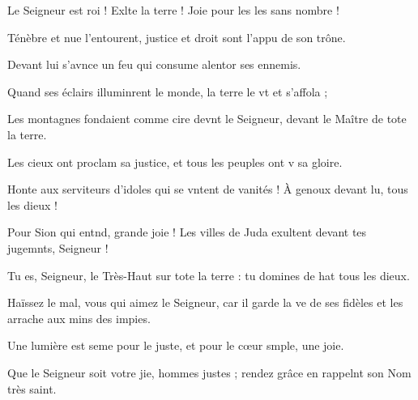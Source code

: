 \item Le Seigneur est roi ! Exlte la terre !\psstar{} Joie pour les les sans nombre !
\item Ténèbre et nue l’entourent,\psstar{} justice et droit sont l’appu de son trône.
\item Devant lui s’avnce un feu\psstar{} qui consume alentor ses ennemis.
\item Quand ses éclairs illuminrent le monde,\psstar{} la terre le vt et s’affola ;
\item Les montagnes fondaient comme cire devnt le Seigneur,\psstar{} devant le Maître de tote la terre.
\item Les cieux ont proclam sa justice,\psstar{} et tous les peuples ont v sa gloire.
\item Honte aux serviteurs d’idoles qui se vntent de vanités !\psstar{} À genoux devant lu, tous les dieux !
\item Pour Sion qui entnd, grande joie !\psstar{} Les villes de Juda exultent devant tes jugemnts, Seigneur !
\item Tu es, Seigneur, le Très-Haut sur tote la terre :\psstar{} tu domines de hat tous les dieux.
\item Haïssez le mal, vous qui aimez le Seigneur,\pscross{} car il garde la ve de ses fidèles\psstar{} et les arrache aux mins des impies.
\item Une lumière est seme pour le juste,\psstar{} et pour le cœur smple, une joie.
\item Que le Seigneur soit votre jie, hommes justes ;\psstar{} rendez grâce en rappelnt son Nom très saint.